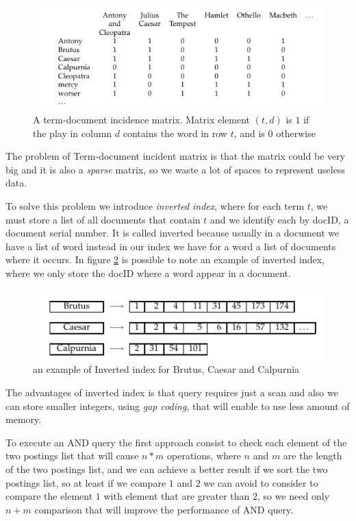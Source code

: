 \begin{figure}
    \caption{A term-document incidence matrix. Matrix element $(t, d)$ is $1$ if the play in column $d$
             contains the word in row $t$, and is $0$ otherwise}
    \label{img:booleanMatrix}
    \includegraphics[width=\textwidth]{Images/booleanMatrix}
\end{figure}
The problem of Term-document incident matrix is that the matrix could be very big and it is also a \emph{sparse}
matrix, so we waste a lot of spaces to represent useless data.

To solve this problem we introduce \emph{inverted index}, where for each term $t$, we must store a list 
of all documents that contain $t$ and we identify each by docID, a document serial number.\newline
It is called inverted because usually in a document we have a list of word instead in our index we have 
for a word a list of documents where it occurs.\newline
In figure \ref{img:invertedIndex} is possible to note an example of inverted index, where we only store the docID
where a word appear in a document.

\begin{figure}
    \caption{an example of Inverted index for Brutus, Caesar and Calpurnia}
    \label{img:invertedIndex}
    \includegraphics[width=\textwidth]{Images/invertedIndex}
\end{figure}
The advantages of inverted index is that query requires just a scan and also we can store smaller integers,
using \emph{gap coding}, that will enable to use less amount of memory.

To execute an AND query the first approach consist to check each element of the two postings list that will cause 
$n * m$ operations, where $n$ and $m$ are the length of the two postings list, and we can achieve a better result
if we sort the two postings list, so at least if we compare $1$ and $2$ we can avoid to consider to compare the
element $1$ with element that are greater than $2$, so we need only $n + m$ comparison that will improve the
performance of AND query.

